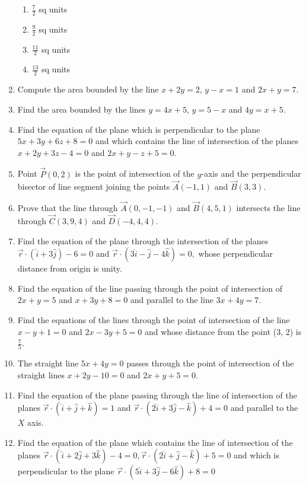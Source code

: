 \begin{enumerate}[label=\thesubsection.\arabic*, ref=\thesubsection.\theenumi]
	\begin{enumerate}[itemsep=1ex]
\item $\frac{7}{2}$ sq units
\item $\frac{9}{2}$ sq units
\item $\frac{11}{2}$ sq units
\item $\frac{13}{2}$ sq units
\end{enumerate}   
\item Compute the area bounded by the line $x + 2y = 2$,  $y - x = 1$ and $2x + y = 7$.
\item Find the area bounded by the lines $y = 4x + 5$,  $y = 5 - x$ and $4y = x + 5$.
\item Find the equation of the plane which is perpendicular to the plane $5x+3y+6z+8=0$ and which contains the line of intersection of the planes $x+2y+3z-4=0$ and $2x+y-z+5=0.$
\item  Point $\vec{P}(0, 2)$ is the point of intersection of the $y$-axis and the perpendicular bisector of line segment joining the points $\vec{A}(-1, 1) $ and $ \vec{B}(3, 3)$.
\item Prove that the line through $\vec{A}(0, -1, -1)$ and $\vec{B}(4, 5, 1)$ intersects the line through $\vec{C}(3, 9, 4)$ and $\vec{D}(-4, 4, 4)$.
\item Find the equation of the plane through the intersection of the planes $\overrightarrow{r} \cdot (\hat{i}+3\hat{j}) - 6=0$ and $\overrightarrow{r} \cdot (3\hat{i}-\hat{j}-4\hat{k})=0, $ whose perpendicular distance from origin is unity.
\item Find the equation of the line passing through the point of intersection of $2x+y=5$ and $x+3y+8=0$ and parallel to the line $3x+4y=7$.
\item Find the equations of the lines through the point of intersection of the line $x-y+1=0 $ and $2x-3y+5=0$ and whose distance from the point (3, 2) is $\frac{7}{5}$.
\item The straight line $5x+4y=0$ passes through the point of intersection of the straight lines $x+2y-10=0$ and $2x+y+5=0$.
\item Find the equation of the plane passing through the line of intersection of the planes  $\overrightarrow{r}\cdot(\hat{i}+\hat{j}+\hat{k})=1$ and $\overrightarrow{r}\cdot(2\hat{i}+3\hat{j}-\hat{k})+4=0$ and parallel to the $X$ axis.
\item Find the equation of the plane which contains the line of intersection of the planes $\overrightarrow{r}\cdot(\hat{i}+2\hat{j}+3\hat{k})-4=0,  \overrightarrow{r} \cdot  (2\hat{i}+\hat{j}-\hat{k})+5=0$ and which is perpendicular to the plane $\overrightarrow{r}\cdot(5\hat{i}+3\hat{j}-6\hat{k})+8=0$

\end{enumerate}
